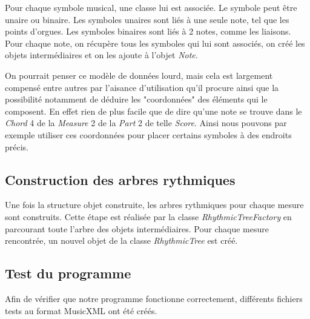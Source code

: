 \par
Pour chaque symbole musical, une classe lui est associée. Le symbole peut être unaire ou binaire.
Les symboles unaires sont liés à une seule note, tel que les points d'orgues. Les symboles binaires
sont liés à 2 notes, comme les liaisons. Pour chaque note, on récupère tous les symboles qui lui 
sont associés, on créé les objets intermédiaires et on les ajoute à l'objet \emph{Note}.


\par
On pourrait penser ce modèle de données lourd, mais cela est largement compensé entre autres
par l'aisance d'utilisation qu'il procure ainsi que la possibilité notamment de déduire les
"coordonnées" des éléments qui le composent. En effet rien de plus facile que de dire
qu'une note se trouve dans le \emph{Chord} 4 de la \emph{Measure} 2 de la \emph{Part}
2 de telle \emph{Score}. Ainsi nous pouvons par exemple utiliser ces coordonnées pour
placer certains symboles à des endroits précis.

\subsection{Construction des arbres rythmiques}

Une fois la structure objet construite, les arbres rythmiques pour chaque mesure sont construits.
Cette étape est réalisée par la classe \emph{RhythmicTreeFactory} en parcourant toute l'arbre des objets intermédiaires.
Pour chaque mesure rencontrée, un nouvel objet de la classe \emph{RhythmicTree} est créé.


\subsection{Test du programme}

Afin de vérifier que notre programme fonctionne correctement, différents fichiers tests au format MusicXML ont été créés.


